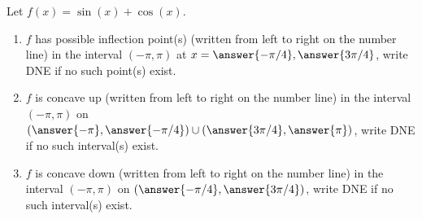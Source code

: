 \documentclass{ximera}
\author{Gregory Hartman \and Matthew Carr}
\begin{document}
\begin{exercise}






Let $f(x)=\sin(x)+\cos(x)$.
\begin{enumerate}
\item		$f$ has possible inflection point(s) (written from left to right on the number line) in the interval $(-\pi,\pi)$ at $x=\answer{-\pi/4},\answer{3\pi/4}$, write DNE if no such point(s) exist.
\item		$f$ is concave up (written from left to right on the number line) in the interval $(-\pi,\pi)$ on $(\answer{-\pi},\answer{-\pi/4})\cup(\answer{3\pi/4},\answer{\pi})$, write DNE if no such interval(s) exist.
\item		$f$ is concave down (written from left to right on the number line) in the interval $(-\pi,\pi)$ on $(\answer{-\pi/4},\answer{3\pi/4})$, write DNE if no such interval(s) exist.
\end{enumerate}

\end{exercise}
\end{document}
